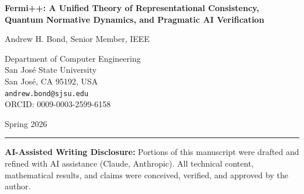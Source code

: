 \documentclass[12pt]{article}
\begin{document}
\begin{titlepage}
\centering
\vspace*{2cm}

{\LARGE\bfseries Fermi++: A Unified Theory of Representational Consistency, Quantum Normative Dynamics, and Pragmatic AI Verification}

\vspace{1.5cm}

{\Large Andrew H. Bond, Senior Member, IEEE}

\vspace{0.5cm}

{\large
Department of Computer Engineering\\
San Jos\'e State University\\
San Jos\'e, CA 95192, USA\\[0.3cm]
\texttt{andrew.bond@sjsu.edu}\\[0.3cm]
ORCID: 0009-0003-2599-6158
}

\vspace{1cm}

{\large Spring 2026}

\vspace{2cm}

\begin{abstract}
We present \textbf{Fermi++}, a unified formal framework for the verification of ethical and logical consistency in autonomous systems. Fermi++ integrates three previously disparate domains: (1) a categorical foundation for representational invariance using double categories, (2) a Noetherian field theory that derives moral conservation laws from symmetries of description, and (3) a quantum normative dynamics (QND) that models moral ambiguity via Hilbert space formalisms. We demonstrate that the ``Bond Index'' ($\beta$) serves as the universal coupling constant across these layers. Finally, we provide an instrumentalist justification for the framework, treating Fermi++ not as a metaphysical claim about the nature of morality, but as a robust engineering instrument for the ``Fermi-level'' verification of foundation models.
\end{abstract}

\vfill

\noindent\rule{\linewidth}{0.4pt}
\small
\noindent\textbf{AI-Assisted Writing Disclosure:} Portions of this manuscript were drafted and refined with AI assistance (Claude, Anthropic). All technical content, mathematical results, and claims were conceived, verified, and approved by the author.


\end{titlepage}
\end{document}
